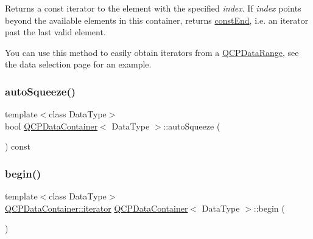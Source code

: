 Returns a const iterator to the element with the specified {\itshape index}. If {\itshape index} points beyond the available elements in this container, returns \mbox{\hyperlink{class_q_c_p_data_container_aa7f7cf239b85b1a28de3d675cc5b3da1}{const\+End}}, i.\+e. an iterator past the last valid element.

You can use this method to easily obtain iterators from a \mbox{\hyperlink{class_q_c_p_data_range}{Q\+C\+P\+Data\+Range}}, see the data selection page for an example. \mbox{\label{class_q_c_p_data_container_a64f0f1621ca46de2352eaf87476db9b1}} 
\subsubsection{\texorpdfstring{autoSqueeze()}{autoSqueeze()}}
{\footnotesize\ttfamily template$<$class Data\+Type$>$ \\
bool \mbox{\hyperlink{class_q_c_p_data_container}{Q\+C\+P\+Data\+Container}}$<$ Data\+Type $>$\+::auto\+Squeeze (\begin{DoxyParamCaption}{ }\end{DoxyParamCaption}) const\hspace{0.3cm}{\ttfamily [inline]}}

\mbox{\label{class_q_c_p_data_container_a80032518413ab8f418f7c81182fd06cb}} 
\subsubsection{\texorpdfstring{begin()}{begin()}}
{\footnotesize\ttfamily template$<$class Data\+Type$>$ \\
\mbox{\hyperlink{class_q_c_p_data_container_a1bb453c3ae37d1ee5268878acb3a9d29}{Q\+C\+P\+Data\+Container\+::iterator}} \mbox{\hyperlink{class_q_c_p_data_container}{Q\+C\+P\+Data\+Container}}$<$ Data\+Type $>$\+::begin (\begin{DoxyParamCaption}{ }\end{DoxyParamCaption})\hspace{0.3cm}{\ttfamily [inline]}}

